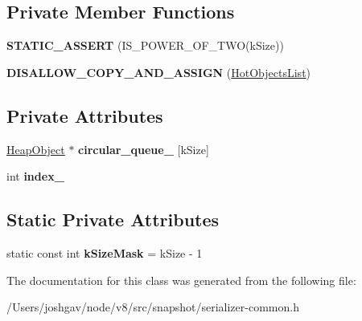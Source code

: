 \subsection*{Private Member Functions}
\begin{DoxyCompactItemize}
\item 
{\bfseries S\+T\+A\+T\+I\+C\+\_\+\+A\+S\+S\+E\+RT} (I\+S\+\_\+\+P\+O\+W\+E\+R\+\_\+\+O\+F\+\_\+\+T\+WO(k\+Size))\hypertarget{classv8_1_1internal_1_1_hot_objects_list_afd2dab0dbe91a93a568b77ccc25cefe9}{}\label{classv8_1_1internal_1_1_hot_objects_list_afd2dab0dbe91a93a568b77ccc25cefe9}

\item 
{\bfseries D\+I\+S\+A\+L\+L\+O\+W\+\_\+\+C\+O\+P\+Y\+\_\+\+A\+N\+D\+\_\+\+A\+S\+S\+I\+GN} (\hyperlink{classv8_1_1internal_1_1_hot_objects_list}{Hot\+Objects\+List})\hypertarget{classv8_1_1internal_1_1_hot_objects_list_afb836d7a9e66a5899f9c526d0eef6095}{}\label{classv8_1_1internal_1_1_hot_objects_list_afb836d7a9e66a5899f9c526d0eef6095}

\end{DoxyCompactItemize}
\subsection*{Private Attributes}
\begin{DoxyCompactItemize}
\item 
\hyperlink{classv8_1_1internal_1_1_heap_object}{Heap\+Object} $\ast$ {\bfseries circular\+\_\+queue\+\_\+} \mbox{[}k\+Size\mbox{]}\hypertarget{classv8_1_1internal_1_1_hot_objects_list_ab3fb4ba142dc5d86be98713f9e0601b1}{}\label{classv8_1_1internal_1_1_hot_objects_list_ab3fb4ba142dc5d86be98713f9e0601b1}

\item 
int {\bfseries index\+\_\+}\hypertarget{classv8_1_1internal_1_1_hot_objects_list_a203150073b644003ba60ab176e359431}{}\label{classv8_1_1internal_1_1_hot_objects_list_a203150073b644003ba60ab176e359431}

\end{DoxyCompactItemize}
\subsection*{Static Private Attributes}
\begin{DoxyCompactItemize}
\item 
static const int {\bfseries k\+Size\+Mask} = k\+Size -\/ 1\hypertarget{classv8_1_1internal_1_1_hot_objects_list_a7670ea6f4ea7e2544471d658d8f25677}{}\label{classv8_1_1internal_1_1_hot_objects_list_a7670ea6f4ea7e2544471d658d8f25677}

\end{DoxyCompactItemize}


The documentation for this class was generated from the following file\+:\begin{DoxyCompactItemize}
\item 
/\+Users/joshgav/node/v8/src/snapshot/serializer-\/common.\+h\end{DoxyCompactItemize}
